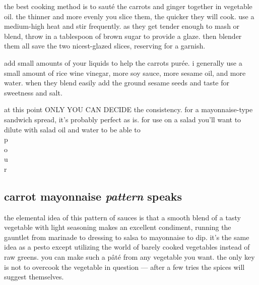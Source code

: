 the best cooking method is to saut\'{e} the carrots and ginger together in 
vegetable oil. the thinner and more evenly you slice them, the quicker they 
will cook. use a medium-high heat and stir frequently. as they get tender 
enough to mash or blend, throw in a tablespoon of brown sugar to provide a 
glaze. then blender them all save the two nicest-glazed slices, reserving for 
a garnish. 

add small amounts of your liquids to help the carrots pur\'{e}e. i generally 
use a small amount of rice wine vinegar, more soy sauce, more sesame oil, and 
more water. when they blend easily add the ground sesame seeds and taste for 
sweetness and salt.

at this point ONLY YOU CAN DECIDE the consistency. for a mayonnaise-type 
sandwich spread, it's probably perfect as is. for use on a salad you'll want 
to dilute with salad oil and water to be able to\\
p\\
\makebox[1ex]{}o\\
\makebox[1.5ex]{}u\\
\makebox[1.8ex]{}r

\subsection{carrot mayonnaise \textit{pattern} speaks}

the elemental idea of this pattern of sauces is that a smooth blend of a tasty 
vegetable with light seasoning makes an excellent condiment, running the 
gauntlet from marinade to dressing to salsa to mayonnaise to dip. it's the 
same idea as a pesto except utilizing the world of barely cooked vegetables 
instead of raw greens. you can make such a p\^{a}t\'{e} from any vegetable you 
want. the only key is not to overcook the vegetable in question --- after a 
few tries the spices will suggest themselves.

